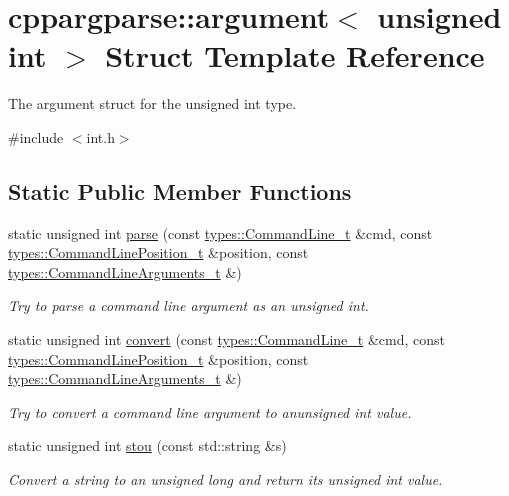 \hypertarget{structcppargparse_1_1argument_3_01unsigned_01int_01_4}{}\section{cppargparse\+:\+:argument$<$ unsigned int $>$ Struct Template Reference}
\label{structcppargparse_1_1argument_3_01unsigned_01int_01_4}


The argument struct for the unsigned int type.  




{\ttfamily \#include $<$int.\+h$>$}

\subsection*{Static Public Member Functions}
\begin{DoxyCompactItemize}
\item 
static unsigned int \hyperlink{structcppargparse_1_1argument_3_01unsigned_01int_01_4_ac9211f741e5688766a4ed489b33b5a1b}{parse} (const \hyperlink{types_8h_a80adf2418b7ce9fe616698efa7533ecf}{types\+::\+Command\+Line\+\_\+t} \&cmd, const \hyperlink{types_8h_a43b4f43f8940de1bf09ced6f1b668053}{types\+::\+Command\+Line\+Position\+\_\+t} \&position, const \hyperlink{types_8h_a003c660afe2ee9c6cc39aea966e8926d}{types\+::\+Command\+Line\+Arguments\+\_\+t} \&)
\begin{DoxyCompactList}\small\item\em Try to parse a command line argument as an unsigned int. \end{DoxyCompactList}\item 
static unsigned int \hyperlink{structcppargparse_1_1argument_3_01unsigned_01int_01_4_ab236112ad1382650862c2f4ee700ed4d}{convert} (const \hyperlink{types_8h_a80adf2418b7ce9fe616698efa7533ecf}{types\+::\+Command\+Line\+\_\+t} \&cmd, const \hyperlink{types_8h_a43b4f43f8940de1bf09ced6f1b668053}{types\+::\+Command\+Line\+Position\+\_\+t} \&position, const \hyperlink{types_8h_a003c660afe2ee9c6cc39aea966e8926d}{types\+::\+Command\+Line\+Arguments\+\_\+t} \&)
\begin{DoxyCompactList}\small\item\em Try to convert a command line argument to anunsigned int value. \end{DoxyCompactList}\item 
static unsigned int \hyperlink{structcppargparse_1_1argument_3_01unsigned_01int_01_4_af8279570a5ca5f628c34b8d881b8ee25}{stou} (const std\+::string \&s)
\begin{DoxyCompactList}\small\item\em Convert a string to an unsigned long and return its unsigned int value. \end{DoxyCompactList}\end{DoxyCompactItemize}


